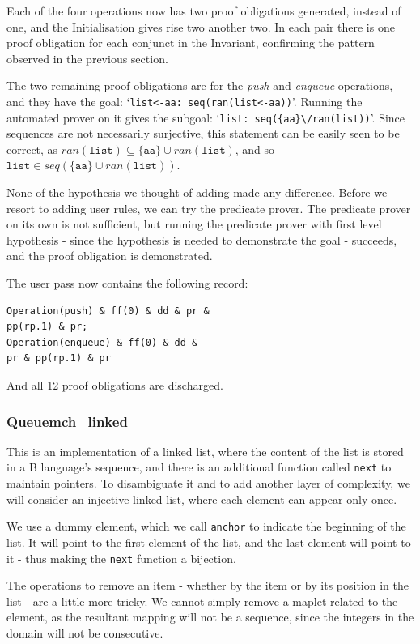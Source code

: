 \documentclass[12pt,journal,duplex]{IEEEtran}
\begin{document}
	Each of the four operations now has two proof obligations generated, instead of one, and the Initialisation gives rise two another two. In each pair there is one proof obligation for each conjunct in the Invariant, confirming the pattern observed in the previous section.

	The two remaining proof obligations are for the \textit{push} and \textit{enqueue} operations, and they have the goal: `\texttt{list<-aa: seq(ran(list<-aa))}'. Running the automated prover on it gives the subgoal: `\verb|list: seq({aa}\/ran(list))|'. Since sequences are not necessarily surjective, this statement can be easily seen to be correct, as $ran(\texttt{list}) \subseteq \{\texttt{aa}\} \cup ran(\texttt{list})$, and so $\texttt{list} \in seq(\{\texttt{aa}\} \cup ran(\texttt{list}))$.

	None of the hypothesis we thought of adding made any difference. Before we resort to adding user rules, we can try the predicate prover. The predicate prover on its own is not sufficient, but running the predicate prover with first level hypothesis - since the hypothesis is needed to demonstrate the goal - succeeds, and the proof obligation is demonstrated.

	The user pass now contains the following record:
	\begin{lstlisting}
Operation(push) & ff(0) & dd & pr &
pp(rp.1) & pr;
Operation(enqueue) & ff(0) & dd &
pr & pp(rp.1) & pr
	\end{lstlisting}

	And all 12 proof obligations are discharged.

	\subsubsection{Queuemch\_linked}

	This is an implementation of a linked list, where the content of the list is stored in a B language's sequence, and there is an additional function called \texttt{next} to maintain pointers. To disambiguate it and to add another layer of complexity, we will consider an injective linked list, where each element can appear only once.

	We use a dummy element, which we call \texttt{anchor} to indicate the beginning of the list. It will point to the first element of the list, and the last element will point to it - thus making the \texttt{next} function a bijection.

	The operations to remove an item - whether by the item or by its position in the list - are a little more tricky. We cannot simply remove a maplet related to the element, as the resultant mapping will not be a sequence, since the integers in the domain will not be consecutive.
\end{document}
